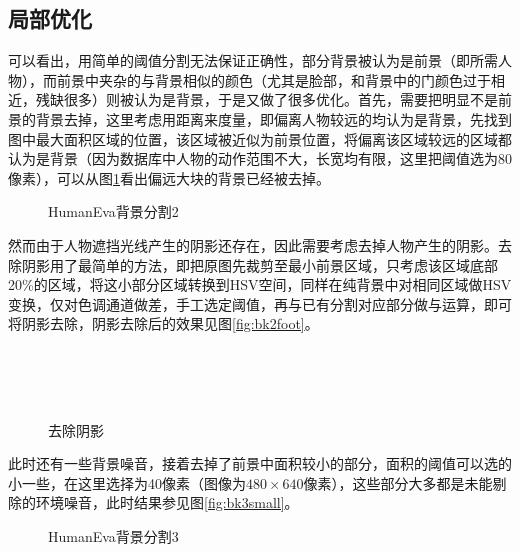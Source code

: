 \subsection{局部优化}
可以看出，用简单的阈值分割无法保证正确性，部分背景被认为是前景（即所需人物），而前景中夹杂的与背景相似的颜色（尤其是脸部，和背景中的门颜色过于相近，残缺很多）则被认为是背景，于是又做了很多优化。首先，需要把明显不是前景的背景去掉，这里考虑用距离来度量，即偏离人物较远的均认为是背景，先找到图中最大面积区域的位置，该区域被近似为前景位置，将偏离该区域较远的区域都认为是背景（因为数据库中人物的动作范围不大，长宽均有限，这里把阈值选为80 像素），可以从图\ref{fig:bkfar}看出偏远大块的背景已经被去掉。

\begin{figure}[htbp]
  \centering
  \caption{HumanEva背景分割2}\label{fig:bkfar}
\end{figure}

然而由于人物遮挡光线产生的阴影还存在，因此需要考虑去掉人物产生的阴影。去除阴影用了最简单的方法，即把原图先裁剪至最小前景区域，只考虑该区域底部20\%的区域，将这小部分区域转换到HSV空间，同样在纯背景中对相同区域做HSV变换，仅对色调通道做差，手工选定阈值，再与已有分割对应部分做与运算，即可将阴影去除，阴影去除后的效果见图\ref{fig:bk2foot}。

\begin{figure}[htbp]
  \centering
  \\
  \\
  \\
  \caption{去除阴影}
\end{figure}

此时还有一些背景噪音，接着去掉了前景中面积较小的部分，面积的阈值可以选的小一些，在这里选择为40像素（图像为$480\times 640$像素），这些部分大多都是未能剔除的环境噪音，此时结果参见图\ref{fig:bk3small}。

\begin{figure}[htbp]
  \centering
  \caption{HumanEva背景分割3}
\end{figure}

